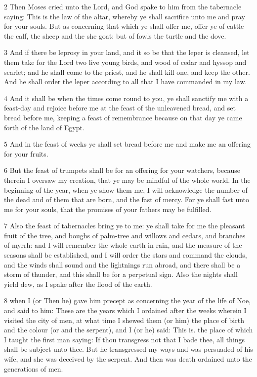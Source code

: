 \par 2 Then Moses cried unto the Lord, and God spake to him from the tabernacle saying: This is the law of the altar, whereby ye shall sacrifice unto me and pray for your souls. But as concerning that which ye shall offer me, offer ye of cattle the calf, the sheep and the she goat: but of fowls the turtle and the dove. 

\par 3 And if there be leprosy in your land, and it so be that the leper is cleansed, let them take for the Lord two live young birds, and wood of cedar and hyssop and scarlet; and he shall come to the priest, and he shall kill one, and keep the other. And he shall order the leper according to all that I have commanded in my law. 

\par 4 And it shall be when the times come round to you, ye shall sanctify me with a feast-day and rejoice before me at the feast of the unleavened bread, and set bread before me, keeping a feast of remembrance because on that day ye came forth of the land of Egypt. 

\par 5 And in the feast of weeks ye shall set bread before me and make me an offering for your fruits. 

\par 6 But the feast of trumpets shall be for an offering for your watchers, because therein I oversaw my creation, that ye may be mindful of the whole world. In the beginning of the year, when ye show them me, I will acknowledge the number of the dead and of them that are born, and the fast of mercy. For ye shall fast unto me for your souls, that the promises of your fathers may be fulfilled. 

\par 7 Also the feast of tabernacles bring ye to me: ye shall take for me the pleasant fruit of the tree, and boughs of palm-tree and willows and cedars, and branches of myrrh: and I will remember the whole earth in rain, and the measure of the seasons shall be established, and I will order the stars and command the clouds, and the winds shall sound and the lightnings run abroad, and there shall be a storm of thunder, and this shall be for a perpetual sign. Also the nights shall yield dew, as I spake after the flood of the earth. 

\par 8 when I (or Then he) gave him precept as concerning the year of the life of Noe, and said to him: These are the years which I ordained after the weeks wherein I visited the city of men, at what time I shewed them (or him) the place of birth and the colour (or and the serpent), and I (or he) said: This is. the place of which I taught the first man saying: If thou transgress not that I bade thee, all things shall be subject unto thee. But he transgressed my ways and was persuaded of his wife, and she was deceived by the serpent. And then was death ordained unto the generations of men. 

